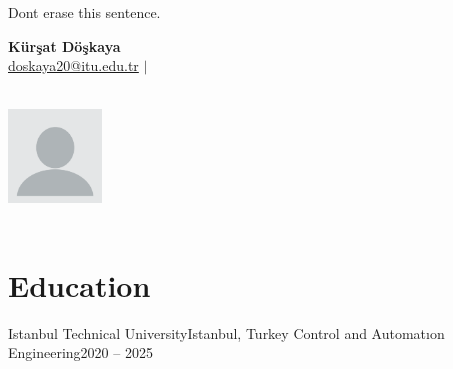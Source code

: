 \label{ResumeOne} %
\thesisspacing %


{\color{white}Dont erase this sentence.}
\medskip



\begin{minipage}{0.7\textwidth}
    \textbf{\Huge Kürşat Döşkaya} \\[5pt]
    \small \href{mailto:youremail@example.com}{doskaya20@itu.edu.tr} $|$ 
\end{minipage}
\begin{minipage}{0.3\textwidth}
    \begin{flushright}
        \includegraphics[width=2.5cm, height=3.5cm]{imgs/your_photo.png} %
    \end{flushright}
\end{minipage}

\section*{Education}
\begin{itemize}[leftmargin=*]
    \resumeEntry
        {Istanbul Technical University}{Istanbul, Turkey}
        {Control and Automatıon Engineering}{2020 – 2025}
\end{itemize}

